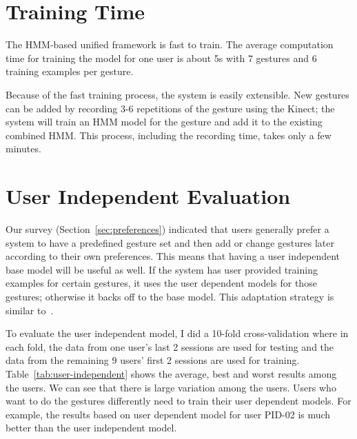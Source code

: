 \section{Training Time}
The HMM-based unified framework is fast to train. The average
computation time for training the model for one user is about 5s with 7 gestures and 6 training examples per
gesture. 

Because of the fast training process, the system is easily extensible. New
gestures can be added by recording 3-6 repetitions of the gesture using the Kinect; the system will train an HMM model for the gesture
and add it to the existing combined HMM. This process, including the recording
time, takes only a few minutes.

\section{User Independent Evaluation}
Our survey (Section~\ref{sec:preferences}) indicated that users
generally prefer a system to have a predefined gesture set and then add or
change gestures later according to their own preferences. This means that having
a user independent base model will be useful as well. If the system has user
provided training examples for certain gestures, it uses the
user dependent models for those gestures; otherwise it backs off to the base
model. This adaptation strategy is similar to~\cite{yin13-making}.

To evaluate the user independent model, I did a 10-fold cross-validation where
in each fold, the data from one user's last 2 sessions are used for testing and
the data from the remaining 9 users' first 2 sessions are used for training.
Table~\ref{tab:user-independent} shows the average, best and worst results among
the users. We can see that there is large variation among the users. Users
who want to do the gestures differently need to train their user
dependent models. For example, the results based on user dependent model for user PID-02
is much better than the user independent model.

